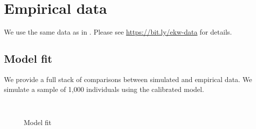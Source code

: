 \section{Empirical data}\label{Empirical data}
We use the same data as in \citet{Keane.1997}. Please see \url{https://bit.ly/ekw-data} for details.

\subsection{Model fit}

We provide a full stack of comparisons between simulated and empirical data. We simulate a sample of 1,000 individuals using the calibrated model.



\begin{figure}[h]\centering
	\caption{Model fit}\label{Model fit appendix}
	\hspace{0.3cm}
	 \\
	\hspace{0.3cm}
\end{figure}
